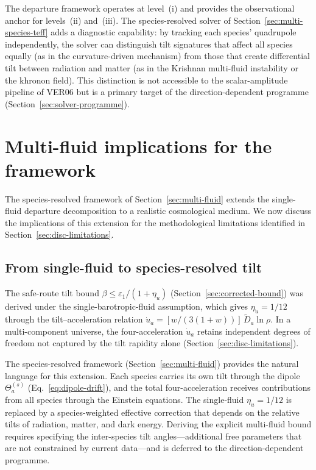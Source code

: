 The departure framework operates at level~(i) and provides
the observational anchor for levels~(ii) and~(iii).  The
species-resolved solver of
Section~\ref{sec:multi-species-teff} adds a diagnostic
capability: by tracking each species' quadrupole
independently, the solver can distinguish tilt signatures
that affect all species equally (as in the curvature-driven
mechanism) from those that create differential tilt between
radiation and matter (as in the Krishnan multi-fluid
instability or the khronon field).  This distinction is not
accessible to the scalar-amplitude pipeline of VER06 but
is a primary target of the direction-dependent programme
(Section~\ref{sec:solver-programme}).


\section{Multi-fluid implications for the framework}
\label{sec:disc-multi-fluid}

The species-resolved framework of
Section~\ref{sec:multi-fluid} extends the single-fluid
departure decomposition to a realistic cosmological
medium.  We now discuss the implications of this extension
for the methodological limitations identified in
Section~\ref{sec:disc-limitations}.


\subsection{From single-fluid to species-resolved tilt}
\label{sec:disc-species-tilt}

The safe-route tilt bound
$\beta \leq \varepsilon_1/(1 + \eta_{\dot{u}})$
(Section~\ref{sec:corrected-bound}) was derived under the
single-barotropic-fluid assumption, which gives
$\eta_{\dot{u}} = 1/12$ through the tilt--acceleration
relation $\dot{u}_a = [w/(3(1+w))]\,\tilde{D}_a \ln
\rho$.  In a multi-component universe, the
four-acceleration $\dot{u}_a$ retains independent degrees
of freedom not captured by the tilt rapidity alone
(Section~\ref{sec:disc-limitations}).

The species-resolved framework
(Section~\ref{sec:multi-fluid}) provides the natural
language for this extension.  Each species carries its own
tilt through the dipole $\Theta^{(s)}_a$
(Eq.~\ref{eq:dipole-drift}), and the total
four-acceleration receives contributions from all species
through the Einstein equations.  The single-fluid
$\eta_{\dot{u}} = 1/12$ is replaced by a species-weighted
effective correction that depends on the relative tilts
of radiation, matter, and dark energy.  Deriving the
explicit multi-fluid bound requires specifying the
inter-species tilt angles---additional free parameters that
are not constrained by current data---and is deferred to
the direction-dependent programme.

